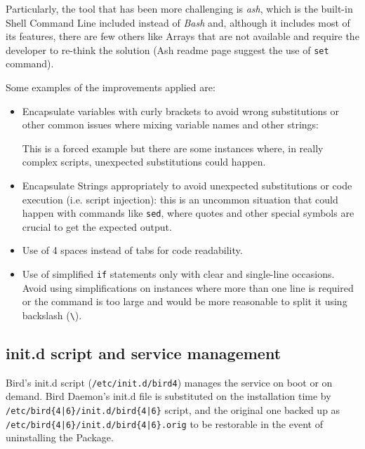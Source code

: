Particularly, the tool that has been more challenging is \textit{ash}, which is the built-in Shell Command Line included instead of \textit{Bash} and, although it includes most of its features, there are few others like Arrays that are not available and require the developer to re-think the solution (Ash readme page suggest the use of \texttt{set} command).

Some examples of the improvements applied are:
\begin{itemize}
    \item Encapsulate variables with curly brackets to avoid wrong substitutions or other common issues where mixing variable names and other strings:
     
    This is a forced example but there are some instances where, in really complex scripts, unexpected substitutions could happen.
    \item Encapsulate Strings appropriately to avoid unexpected substitutions or code execution (i.e. script injection): this is an uncommon situation that could happen with commands like \texttt{sed}, where quotes and other special symbols are crucial to get the expected output.
    \item Use of 4 spaces instead of tabs for code readability.
    \item Use of simplified \texttt{if} statements only with clear and single-line occasions. Avoid using simplifications on instances where more than one line is required or the command is too large and would be more reasonable to split it using backslash (\texttt{\textbackslash}).
    
\end{itemize}

\subsection{init.d script and service management}
\label{sec:initd}
Bird's init.d script (\texttt{/etc/init.d/bird4}) manages the service on boot or on demand. Bird Daemon's init.d file is substituted on the installation time by \texttt{/etc/bird\{4|6\}/init.d/bird\{4|6\}} script, and the original one backed up as \texttt{/etc/bird\{4|6\}/init.d/bird\{4|6\}.orig} to be restorable in the event of uninstalling the Package.

